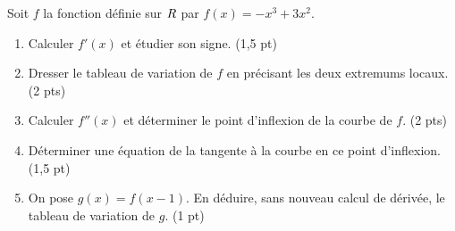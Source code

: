 \begin{devoir}[2 heures]
Soit $f$ la fonction définie sur $R$ par $f(x) = -x^{3}+3x^{2}$.
\begin{enumerate}[label=\textbf{\arabic*.}, leftmargin=*, itemsep=0.2em]
  \item Calculer $f'(x)$ et étudier son signe. \hfill\textup{(1,5 pt)}
  \item Dresser le tableau de variation de $f$ en précisant les deux
        extremums locaux. \hfill\textup{(2 pts)}
  \item Calculer $f''(x)$ et déterminer le point d'inflexion de la courbe de
        $f$. \hfill\textup{(2 pts)}
  \item Déterminer une équation de la tangente à la courbe en ce point
        d'inflexion. \hfill\textup{(1,5 pt)}
  \item On pose $g(x) = f(x-1)$. En déduire, sans nouveau calcul de dérivée,
        le tableau de variation de $g$. \hfill\textup{(1 pt)}
\end{enumerate}
\end{devoir}

